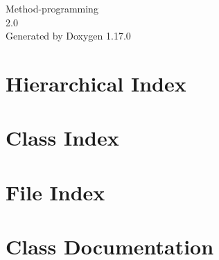 \documentclass[twoside]{book}
\newcommand{\+}{\discretionary{\mbox{\scriptsize$\hookleftarrow$}}{}{}}
\newcommand{\clearemptydoublepage}{%
    \newpage{\pagestyle{empty}\cleardoublepage}%
  }
\begin{document}
  \raggedbottom
    \hypersetup{pageanchor=false,
                bookmarksnumbered=true,
                pdfencoding=unicode
               }
  \begin{titlepage}
  \vspace*{7cm}
  \begin{center}%
  {\Large Method-\/programming}\\
  [1ex]\large 2.\+0 \\
  \vspace*{1cm}
  {\large Generated by Doxygen 1.17.0}\\
  \end{center}
  \end{titlepage}
  \clearemptydoublepage
  \tableofcontents
  \clearemptydoublepage
  \hypersetup{pageanchor=true}

\chapter{Hierarchical Index}

\chapter{Class Index}

\chapter{File Index}

\chapter{Class Documentation}








\end{document}
